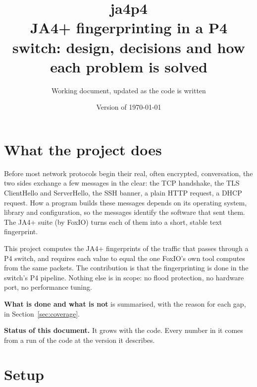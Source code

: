 \documentclass[11pt,a4paper]{article}
\title{\textbf{ja4p4}\\[2pt]\large JA4+ fingerprinting in a P4 switch: design, decisions and how each problem is solved}
\author{Working document, updated as the code is written}
\date{Version of \today}
\begin{document}
\maketitle
\tableofcontents
\newpage

\section{What the project does}

Before most network protocols begin their real, often encrypted, conversation, the two sides exchange a few
messages in the clear: the TCP handshake, the TLS ClientHello and ServerHello, the SSH banner, a plain HTTP request,
a DHCP request. How a program builds these messages depends on its operating system, library and configuration, so
the messages identify the software that sent them. The JA4+ suite (by FoxIO) turns each of them into a short,
stable text fingerprint.

This project computes the JA4+ fingerprints of the traffic that passes through a P4 switch, and requires each value
to equal the one FoxIO's own tool computes from the same packets. The contribution is that the fingerprinting is
done in the switch's P4 pipeline. Nothing else is in scope: no flood protection, no hardware port, no performance
tuning.

\textbf{What is done and what is not} is summarised, with the reason for each gap, in
Section~\ref{sec:coverage}.

\textbf{Status of this document.} It grows with the code. Every number in it comes from a run of the code at the version it describes.

\section{Setup}
\end{document}
